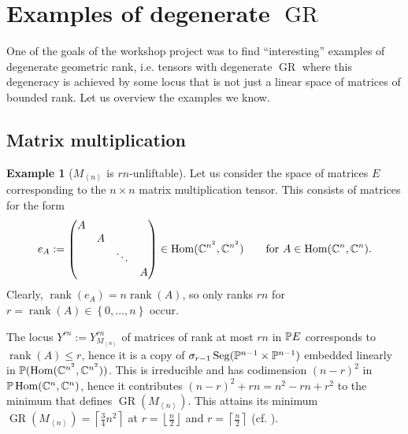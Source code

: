 \documentclass[a4paper,10pt]{article}
\def\floor#1{\left\lfloor#1\right\rfloor}
\def\ceil#1{\left\lceil#1\right\rceil}
\def\set#1{\left\{#1\right\}}
\def\gener#1{\left\langle#1\right\rangle}
\def\mtrx#1{\begin{pmatrix}#1\end{pmatrix}}
\DeclareMathOperator{\Hom}{Hom}\let\hom\Hom
\DeclareMathOperator{\rank}{rank}\let\rk\rank
\DeclareMathOperator{\Seg}{Seg}
\DeclareMathOperator{\GR}{GR}
\def\uv#1{``#1''}
\theoremstyle{definition}
\newtheorem{example}[theorem]{Example}
\theoremstyle{remark}
\begin{document}
\section{Examples of degenerate $\GR$}
\label{sec:examples}

One of the goals of the workshop project was to find \uv{interesting} examples of degenerate geometric rank, i.e. tensors with degenerate $\GR$ where this degeneracy is achieved by some locus that is not just a linear space of matrices of bounded rank. Let us overview the examples we know.

\subsection{Matrix multiplication}

\begin{example}[$M_{\gener n}$ is $rn$-unliftable]
    Let us consider the space of matrices $E$ corresponding to the $n\times n$ matrix multiplication tensor. This consists of matrices for the form
    \[
        e_A := \mtrx{A&&&\\&A&&\\&&\ddots&\\&&&A} \in \Hom(\ce^{n^2}, \ce^{n^2})\qquad \text{for $A\in\Hom(\ce^n, \ce^n)$.}
    \]
    Clearly, $\rank(e_A) = n \rank(A)$, so only ranks $rn$ for $r=\rank(A)\in\set{0,\dots,n}$ occur.

    The locus $Y^{rn}:=Y^{rn}_{M_{\gener n}}$ of matrices of rank at most $rn$ in $\pe E$ corresponds to $\rank(A)\leq r$, hence it is a copy of $\sigma_{r-1}\Seg(\pe^{n-1}\times\pe^{n-1})$ embedded linearly in $\pe(\Hom(\ce^{n^2}, \ce^{n^2}))$. This is irreducible and has codimension $(n-r)^2$ in $\pe\Hom(\ce^n,\ce^n)$, hence it contributes $(n-r)^2+rn = n^2-rn+r^2$ to the minimum that defines $\GR(M_{\gener n})$. This attains its minimum $\GR(M_{\gener n})=\ceil{\frac34n^2}$ at $r=\floor{\frac n2}$ and $r=\ceil{\frac n2}$ (cf. \cite[Theorem 6.1]{kopparty-moshkovitz-zuiddam}).


\end{example}
\end{document}
